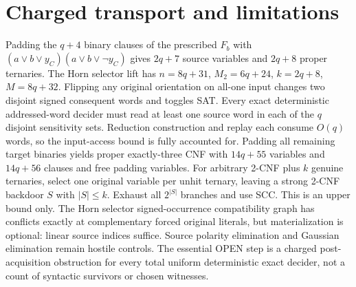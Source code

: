 \documentclass[11pt]{article}
\begin{document}
\section{Charged transport and limitations}
Padding the $q+4$ binary clauses of the prescribed $F_b$ with $(a\vee b\vee y_C)(a\vee b\vee\neg y_C)$ gives $2q+7$ source variables and $2q+8$ proper ternaries. The Horn selector lift has $n=8q+31$, $M_2=6q+24$, $k=2q+8$, $M=8q+32$. Flipping any original orientation on all-one input changes two disjoint signed consequent words and toggles SAT. Every exact deterministic addressed-word decider must read at least one source word in each of the $q$ disjoint sensitivity sets. Reduction construction and replay each consume $O(q)$ words, so the input-access bound is fully accounted for. Padding all remaining target binaries yields proper exactly-three CNF with $14q+55$ variables and $14q+56$ clauses and free padding variables.
For arbitrary 2-CNF plus $k$ genuine ternaries, select one original variable per unhit ternary, leaving a strong 2-CNF backdoor $S$ with $|S|\le k$. Exhaust all $2^{|S|}$ branches and use SCC. This is an upper bound only. The Horn selector signed-occurrence compatibility graph has conflicts exactly at complementary forced original literals, but materialization is optional: linear source indices suffice. Source polarity elimination and Gaussian elimination remain hostile controls. The essential OPEN step is a charged post-acquisition obstruction for every total uniform deterministic exact decider, not a count of syntactic survivors or chosen witnesses.
\end{document}
